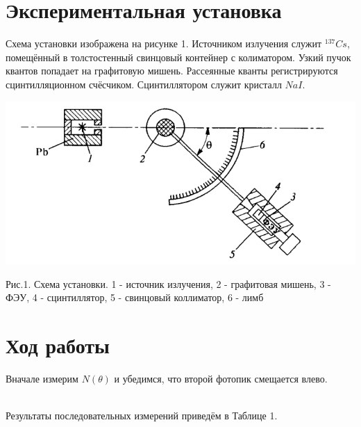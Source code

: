 \documentclass[14pt,a4paper]{scrartcl}
\begin{document}
\section{Экспериментальная установка}

\quad Схема установки изображена на рисунке 1. Источником излучения служит $^{137}Cs$, помещённый в толстостенный свинцовый контейнер с колиматором. Узкий пучок квантов попадает на графитовую мишень. Рассеянные кванты регистрируются сцинтилляционном счёсчиком. Сцинтиллятором служит кристалл $NaI$.

\begin{center}
\includegraphics[scale=0.5]{1.png}\newline
\caption{Рис.1. Схема установки. 1 - источник излучения, 2 - графитовая мишень, 3 - ФЭУ, 4 - сцинтиллятор, 5 - свинцовый коллиматор, 6 - лимб }
\end{center}

\section{Ход работы}
Вначале измерим $N(\theta)$ и убедимся, что второй фотопик смещается влево. 

\\
Результаты последовательных измерений приведём в Таблице 1.
\end{document}
